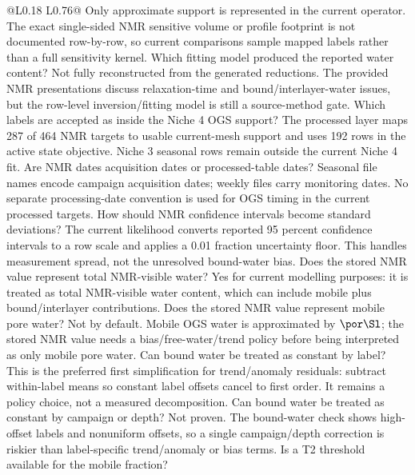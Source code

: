 \begin{longtable}{@{}L{0.18\textwidth} L{0.76\textwidth}@{}}
{Only approximate support is represented in the current operator.  The exact
single-sided NMR sensitive volume or profile footprint is not documented row-by-row,
so current comparisons sample mapped labels rather than a full sensitivity kernel.}
{ Which fitting model produced the reported water content?}
{Not fully reconstructed from the generated reductions.  The provided NMR
presentations discuss relaxation-time and bound/interlayer-water issues, but the
row-level inversion/fitting model is still a source-method gate.}
{ Which labels are accepted as inside the Niche 4 OGS support?}
{The processed layer maps 287 of 464 NMR targets to usable current-mesh support and
uses 192 rows in the active state objective.  Niche 3 seasonal rows remain outside
the current Niche 4 fit.}
{ Are NMR dates acquisition dates or processed-table dates?}
{Seasonal file names encode campaign acquisition dates; weekly files carry monitoring
dates.  No separate processing-date convention is used for OGS timing in the current
processed targets.}
{ How should NMR confidence intervals become standard deviations?}
{The current likelihood converts reported 95 percent confidence intervals to a row
scale and applies a 0.01 fraction uncertainty floor.  This handles measurement spread,
not the unresolved bound-water bias.}
{ Does the stored NMR value represent total NMR-visible water?}
{Yes for current modelling purposes: it is treated as total NMR-visible water content,
which can include mobile plus bound/interlayer contributions.}
{ Does the stored NMR value represent mobile pore water?}
{Not by default.  Mobile OGS water is approximated by \(\por\Sl\); the stored NMR
value needs a bias/free-water/trend policy before being interpreted as only mobile
pore water.}
{ Can bound water be treated as constant by label?}
{This is the preferred first simplification for trend/anomaly residuals: subtract
within-label means so constant label offsets cancel to first order.  It remains a
policy choice, not a measured decomposition.}
{ Can bound water be treated as constant by campaign or depth?}
{Not proven.  The bound-water check shows high-offset labels and nonuniform offsets,
so a single campaign/depth correction is riskier than label-specific trend/anomaly or
bias terms.}
{ Is a T2 threshold available for the mobile fraction?}

\end{longtable}
